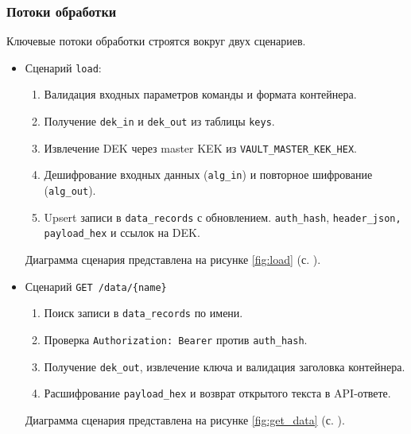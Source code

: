 \documentclass[14pt, a4paper]{extarticle}
\begin{document}
	\subsubsection{Потоки обработки}
	
	Ключевые потоки обработки строятся вокруг двух сценариев.
	
	
	\begin{itemize}
	
	\item Сценарий \texttt{load}:
	
	\begin{enumerate}
	\item Валидация входных параметров команды и формата контейнера.
	\item Получение \texttt{dek\_in} и \texttt{dek\_out} из таблицы \texttt{keys}.
	\item Извлечение DEK через master KEK из \texttt{VAULT\_MASTER\_KEK\_HEX}.
	\item Дешифрование входных данных (\texttt{alg\_in}) и повторное шифрование (\texttt{alg\_out}).
	\item Upsert записи в \texttt{data\_records} с обновлением. \texttt{auth\_hash}, \texttt{header\_json, payload\_hex} и ссылок на DEK.
	\end{enumerate}
	
	Диаграмма сценария представлена на рисунке \ref{fig:load} (с. \pageref{fig:load}).
	
	
	\item Сценарий \texttt{GET /data/\{name\}}
	
	\begin{enumerate}
	\item Поиск записи в \texttt{data\_records} по имени.
	\item Проверка \texttt{Authorization: Bearer} против \texttt{auth\_hash}.
	\item Получение \texttt{dek\_out}, извлечение ключа и валидация заголовка контейнера.
	\item Расшифрование \texttt{payload\_hex} и возврат открытого текста в API-ответе.
	\end{enumerate}
	
	Диаграмма сценария представлена на рисунке \ref{fig:get_data} (с. \pageref{fig:get_data}).
	

\end{itemize}
\end{document}
